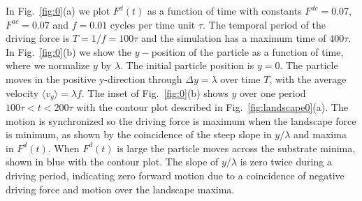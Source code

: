 \documentclass[twocolumn,preprintnumbers,amsmath,amssymb,aps,prx]{revtex4}
\begin{document}
In Fig.~\ref{fig:0}(a)
we plot $F^d(t)$ %
as a function of time with
constants $F^{dc}=0.07$, 
$F^{ac}=0.07$ and $f=0.01$ cycles per time unit $\tau$.
The temporal period of the driving force is
$T = 1/f = 100 \tau$ and 
the simulation has a maximum
time of $400 \tau$.
%
In Fig.~\ref{fig:0}(b) 
we show the $y-$position of the particle
as a function of time,
where we 
normalize $y$ by $\lambda$.
The initial particle position is $y = 0 $. %
The particle moves
in the positive y-direction
through $\Delta y = \lambda$ over time $T$,
with 
the average velocity 
$\langle {v}_y \rangle = \lambda f$. %
The inset of Fig.~\ref{fig:0}(b)
shows $y$ %
over one period $100\tau < t < 200 \tau$
with 
the contour plot described
in Fig.~\ref{fig:landscape0}(a).
The motion is synchronized so the 
driving force is maximum when the landscape 
force is minimum,
as shown by the coincidence of the
steep slope in 
$y/\lambda$ 
and maxima in $F^d(t)$.
When $F^d(t)$ is large 
the particle moves across the substrate minima,
shown in blue with the contour plot.
The slope of $y/\lambda$ is zero twice
during a driving period,
indicating zero
forward motion 
due to a coincidence of negative
driving force and motion over the landscape maxima.
\end{document}

